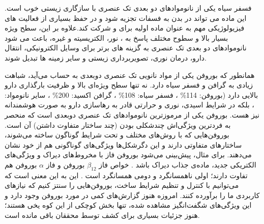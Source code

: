 فسفر سیاه یکی از نانوموادهای دو بعدی تک عنصری با سازگاری زیستی خوب است. این ماده می تواند در بدن به فسفات تجزیه شود و در حفظ بسیاری از فعالیت های فیزیولوژیکی مهم به عنوان ماده اولیه برای  و  شرکت کند.\cite{shaoBiodegradableBlackPhosphorusbased2016,taoBlackPhosphorusNanosheets2017}علاوه بر این، سطح ویژه بسیار بالا و سطوح مختلف پاسخ به ، نور، الکتریسیته و غیره، باعث می شود نانوموادهای دو بعدی تک عنصری به گزینه های برتر برای وسایل الکترونیکی، انتقال دارو، درمان نوری، تصویربرداری زیستی و سایر زمینه ها تبدیل شوند. \cite{liEngineeredFunctionalized2D2020,shiPHSensitiveNanoscaleMaterials2020}

همانطور که بوروفن یکی از مواد نانویی تک عنصری دوبعدی به حساب می‌آید، شباهت زیادی به گرافن و فسفر سیاه دارد. نه تنها سطح ویژه‌ای بالا و ظرفیت بارگذاری دارو بالایی دارد (بوروفن: 114\% \cite{jiNovelTopDownSynthesis2018}، فسفر سیاه: 108\% \cite{taoBlackPhosphorusNanosheets2017}، گرافن اکسید: 200\% \cite{zhangFunctionalGrapheneOxide2010}، سایر نانومواد: ، بلکه در شرایط اسیدی، نوری و حرارتی قادر به رهاسازی دارو به صورت هوشمندانه نیز هست. بوروفن یکی از مرموزترین نانوموادهای تک عنصری دوبعدی است که منحصر به فردترین ویژگی‌اش چندشکلی بودن (چند ساختار متفاوت داشتن) آن است. بوروفن‌هایی که با روش‌های مختلف و تحت شرایط گوناگون ساخته می‌شوند، ساختارهای متفاوتی دارند و این دگرشکل‌ها ویژگی‌های گوناگونی هم از خود نشان می‌دهند. برای مثال، پیش‌بینی می‌شود بوروفن فاز  با مخروط‌های دیراک و ویژگی‌های الکتریکی جدید، ماده‌ی جذاب دیراک باشد \cite{zhouSemimetallicTwoDimensionalBoron2014}. خواص فاز $\beta_{12}$ بوروفن و فاز $\alpha$ بوروفن هم تفاوت دارند؛ اولی ناهمسانگرد و دومی همسانگرد است \cite{zhouSuperiorLatticeThermal2017, xiaoLatticeThermalConductivity2017}. این به این معنی است که می‌توانیم با کنترل و تنظیم شرایط ساخت، بوروفن‌هایی را سنتز کنیم که نیازهای کاربردی ما را برآورده کنند. امروزه هنوز گزارش‌های کمی در مورد بوروفن وجود دارد و این ویژگی‌های شگفت‌انگیز مشاهده شده، تنها بخش کوچکی از این کوه یخی هستند؛ هنوز جزئیات بسیاری برای کشف توسط محققان باقی مانده است.

